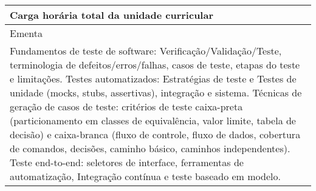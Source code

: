 \begin{quadro}[ht!]
\begin{tabular}{|p{3cm} p{2cm} p{3cm} p{2cm} p{3cm} p{2cm}|}
\multicolumn{5}{|p{13cm}|}{\cellcolor{blue1} Carga horária total da unidade curricular} & \multicolumn{1}{p{1cm}|}{\raggedleft 60	}\\\hline
\multicolumn{6}{|p{15cm}|}{\cellcolor{blue1} Ementa} \\\hline
\hline\multicolumn{6}{|p{15cm}|}{\scriptsize Fundamentos de teste de software: Verificação/Validação/Teste, terminologia de defeitos/erros/falhas, casos de teste, etapas do teste e limitações. Testes automatizados: Estratégias de teste e Testes de unidade (mocks, stubs, assertivas), integração e sistema. Técnicas de geração de casos de teste: critérios de teste caixa-preta (particionamento em classes de equivalência, valor limite, tabela de decisão) e caixa-branca (fluxo de controle, fluxo de dados, cobertura de comandos, decisões, caminho básico, caminhos independentes). Teste end-to-end: seletores de interface, ferramentas de automatização, Integração contínua e teste baseado em modelo.}\\\hline
\hline
	\end{tabular}
\end{quadro}
